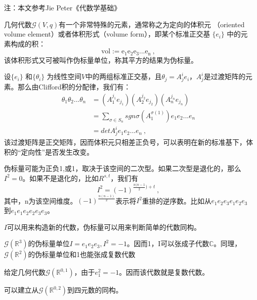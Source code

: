 
注：本文参考Jie Peter《代数学基础》

几何代数$\mathcal G(V,q)$有一个非常特殊的元素，通常称之为定向的体积元
（oriented volume element）或者体积形式（volume form），即某个标准正交基 $\{e_i\}$ 中的元素构成的积：
$$\mathrm {vol:=e_1e_2e_3...e_n}~,$$
该体积形式又可被叫作伪标量单位，称其平方的结果为伪标量。

设$\{e_i\}$ 和$\{\theta_i\}$ 为线性空间$V$中的两组标准正交基，且$\theta_j=A^i_j e_i$，$A^i_j$是过渡矩阵的元素。那么由Clifford积的分配律，我们有：
\begin{equation}
\begin{aligned}
\theta_1\theta_2...\theta_n&=(A^{j_1}_1 e_{j_1})(A^{j_2}_2 e_{j_2})(A^{j_n}_n e_{j_n})\\
&=\sum_{\sigma\in S_n} sgn\sigma(A^{\sigma (1)}_1)e_1e_2...e_n\\
&=det A^i_je_1e_2...e_n~,
\end{aligned}
\end{equation}
该过渡矩阵是正交矩阵，因而体积元只相差正负号，可以表明在新的标准基下，体积的“定向性”是否发生改变。

伪标量可能为正负1,或1，取决于该空间的二次型。如果二次型是退化的，那么$I^2=0$。如果不是退化的，比如$R^{s,t}$，我们有
\begin{equation}
I^2=(-1)^{\frac{n(n-1}{2})+t}~,
\end{equation}
其中，n为该空间维度。$(-1)^{\frac{n(n-1)}{2}}$表示将$I^2$重排的逆序数。比如从$e_1e_2e_3e_1e_2e_3$到$e_1e_1e_2e_2e_3e_3$。

$I$可以用来构造新的代数，伪标量可以用来判断简单的代数同构。

\begin{example}{}
$\mathcal G(\mathbb R^3)$的伪标量单位$I=e_1e_2e_3,I^2=-1$。因而{1，I}可以张成子代数$\mathbb C$。同理，$\mathcal G(\mathbb R^2)$的伪标量单位和1也能张成复数代数
\end{example}
\begin{example}{}
给定几何代数$\mathcal G(\mathbb R^{0,1})$，由于$e_1^2=-1$。因而该代数就是复数代数。
\end{example}
\begin{example}{}
可以建立从$\mathcal G(\mathbb R^{0,2})$到四元数的同构。
\end{example}
